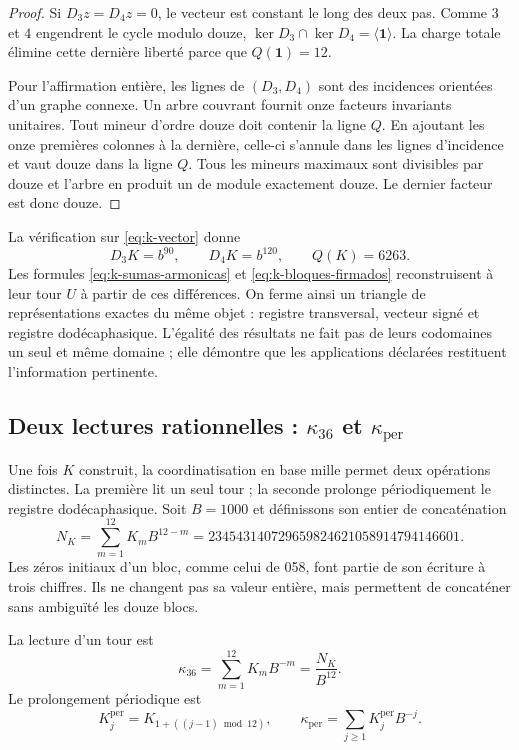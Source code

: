 \begin{proof}
Si \(D_3z=D_4z=0\), le vecteur est constant le long des deux pas.
Comme \(3\) et \(4\) engendrent le cycle modulo douze,
\(\ker D_3\cap\ker D_4=\langle\mathbf1\rangle\). La charge totale
élimine cette dernière liberté parce que \(Q(\mathbf1)=12\).

Pour l'affirmation entière, les lignes de \((D_3,D_4)\) sont des incidences orientées d'un graphe connexe. Un arbre couvrant fournit onze facteurs invariants unitaires. Tout mineur d'ordre douze doit contenir la ligne \(Q\). En ajoutant les onze premières colonnes à la dernière, celle-ci s'annule dans les lignes d'incidence et vaut douze dans la ligne \(Q\). Tous les mineurs maximaux sont divisibles par douze et l'arbre en produit un de module exactement douze. Le dernier facteur est donc douze.
\end{proof}

La vérification sur \eqref{eq:k-vector} donne
\[
 D_3K=b^{90},\qquad D_4K=b^{120},\qquad Q(K)=6263.
\]
Les formules \eqref{eq:k-sumas-armonicas} et
\eqref{eq:k-bloques-firmados} reconstruisent à leur tour \(U\) à partir de ces
différences. On ferme ainsi un triangle de représentations exactes du
même objet : registre transversal, vecteur signé et registre dodécaphasique. L'égalité
des résultats ne fait pas de leurs codomaines un seul et même domaine ; elle démontre que
les applications déclarées restituent l'information pertinente.

\subsection{Deux lectures rationnelles : \texorpdfstring{\(\kappa_{36}\)}{kappa36} et \texorpdfstring{\(\kappa_{\mathrm{per}}\)}{kappa périodique}}
\label{subsec:k-kappas}

Une fois \(K\) construit, la coordinatisation en base mille permet deux opérations
distinctes. La première lit un seul tour ; la seconde prolonge périodiquement le registre
dodécaphasique. Soit \(B=1000\) et définissons son entier de concaténation
\begin{equation}
 N_K=\sum_{m=1}^{12}K_mB^{12-m}
 =234543140729659824621058914794146601.
 \label{eq:k-numerador}
\end{equation}
Les zéros initiaux d'un bloc, comme celui de 058, font partie de son écriture
à trois chiffres. Ils ne changent pas sa valeur entière, mais permettent de concaténer
sans ambiguïté les douze blocs.

\begin{definition}
\label{def:k-kappas}
La lecture d'un tour est
\[
 \kappa_{36}=\sum_{m=1}^{12}K_mB^{-m}=\frac{N_K}{B^{12}}.
\]
Le prolongement périodique est
\[
 K_j^{\mathrm{per}}=K_{1+((j-1)\bmod12)},\qquad
 \kappa_{\mathrm{per}}=\sum_{j\geq1}K_j^{\mathrm{per}}B^{-j}.
\]
\end{definition}

